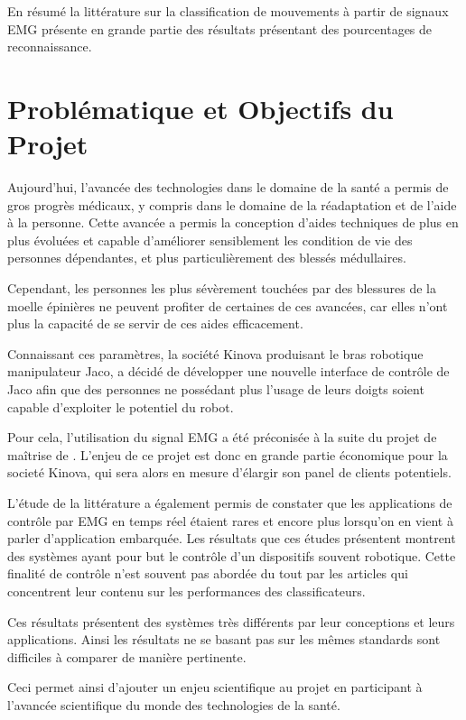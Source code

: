 \documentclass[letterpaper, twoside, 12pt, memoire, creativecommons, hyperref]{thETS}
\begin{document}
En résumé la littérature sur la classification de mouvements à partir de signaux EMG présente en grande partie des résultats présentant des pourcentages de reconnaissance.

\chapter{Problématique et Objectifs du Projet}

Aujourd'hui, l'avancée des technologies dans le domaine de la santé a permis de gros progrès médicaux, y compris dans le domaine de la réadaptation et de l'aide à la personne. Cette avancée a permis la conception d'aides techniques de plus en plus évoluées et capable d'améliorer sensiblement les condition de vie des personnes dépendantes, et plus particulièrement des blessés médullaires. 

Cependant, les personnes les plus sévèrement touchées par des blessures de la moelle épinières ne peuvent profiter de certaines de ces avancées, car elles n'ont plus la capacité de se servir de ces aides efficacement. 

Connaissant ces paramètres, la société Kinova produisant le bras robotique manipulateur Jaco, a décidé de développer une nouvelle interface de contrôle de Jaco afin que des personnes ne possédant plus l'usage de leurs doigts soient capable d'exploiter le potentiel du robot.

Pour cela, l'utilisation du signal EMG a été préconisée à la suite du projet de maîtrise de \cite{Maheu2011}. L'enjeu de ce projet est donc en grande partie économique pour la societé Kinova, qui sera alors en mesure d'élargir son panel de clients potentiels.

L'étude de la littérature a également permis de constater que les applications de contrôle par EMG en temps réel étaient rares et encore plus lorsqu'on en vient à parler d'application embarquée. Les résultats que ces études présentent montrent des systèmes ayant pour but le contrôle d'un dispositifs souvent robotique. Cette finalité de contrôle n'est souvent pas abordée du tout par les articles qui concentrent leur contenu sur les performances des classificateurs. 

Ces résultats présentent des systèmes très différents par leur conceptions et leurs applications. Ainsi les résultats ne se basant pas sur les mêmes standards sont difficiles à comparer de manière pertinente.

Ceci permet ainsi d'ajouter un enjeu scientifique au projet en participant à l'avancée scientifique du monde des technologies de la santé.
\end{document}
